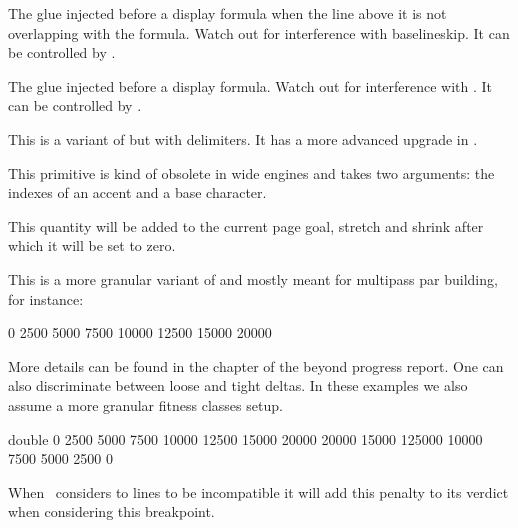 The glue injected before a display formula when the line above it is not
overlapping with the formula. Watch out for interference with \prm
{baselineskip}. It can be controlled by .

\stopoldprimitive

\startoldprimitive[title={\prm {abovedisplayskip}}]

The glue injected before a display formula. Watch out for interference with
. It can be controlled by .

\stopoldprimitive

\startoldprimitive[title={\prm {abovewithdelims}}][obsolete=yes]

This is a variant of  but with delimiters. It has a more advanced
upgrade in .

\stopoldprimitive

\startoldprimitive[title={\prm {accent}}][obsolete=yes]

This primitive is kind of obsolete in wide engines and takes two arguments: the
indexes of an accent and a base character.

\stopoldprimitive

\startnewprimitive[title={\prm {additionalpageskip}}]

This quantity will be added to the current page goal, stretch and shrink after
which it will be set to zero.

\stopnewprimitive

\startnewprimitive[title={\prm {adjacentdemerits}}]

This is a more granular variant of  and mostly meant for multipass
par building, for instance:

\starttyping
{} 0 2500 5000 7500 10000 12500 15000 20000
\stoptyping

More details can be found in the  chapter of the \quote
{beyond} progress report. One can also discriminate between loose and tight
deltas. In these examples we also assume a more granular fitness classes setup.

\starttyping
{} double
        0  2500   5000  7500 10000 12500 15000 20000
    20000 15000 125000 10000 7500   5000  2500     0
\stoptyping

\stopnewprimitive

\startoldprimitive[title={\prm {adjdemerits}}]

When \TEX\ considers to lines to be incompatible it will add this penalty to its
verdict when considering this breakpoint.

